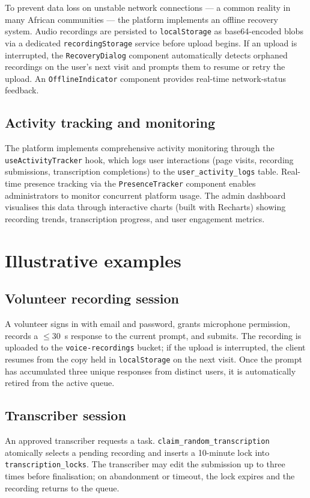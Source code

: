 \documentclass[final,5p,times,twocolumn]{elsarticle}
\begin{document}
To prevent data loss on unstable network connections --- a common reality in many African communities --- the platform implements an offline recovery system. Audio recordings are persisted to \texttt{localStorage} as base64-encoded blobs via a dedicated \texttt{recordingStorage} service before upload begins. If an upload is interrupted, the \texttt{RecoveryDialog} component automatically detects orphaned recordings on the user's next visit and prompts them to resume or retry the upload. An \texttt{OfflineIndicator} component provides real-time network-status feedback.

\subsection{Activity tracking and monitoring}
The platform implements comprehensive activity monitoring through the \texttt{useActivityTracker} hook, which logs user interactions (page visits, recording submissions, transcription completions) to the \texttt{user\_activity\_logs} table. Real-time presence tracking via the \texttt{PresenceTracker} component enables administrators to monitor concurrent platform usage. The admin dashboard visualises this data through interactive charts (built with Recharts) showing recording trends, transcription progress, and user engagement metrics.

\section{Illustrative examples}


\subsection{Volunteer recording session}
A volunteer signs in with email and password, grants microphone permission, records a $\leq 30$~s response to the current prompt, and submits. The recording is uploaded to the \texttt{voice-recordings} bucket; if the upload is interrupted, the client resumes from the copy held in \texttt{localStorage} on the next visit. Once the prompt has accumulated three unique responses from distinct users, it is automatically retired from the active queue.

\subsection{Transcriber session}
An approved transcriber requests a task. \texttt{claim\_random\_transcription} atomically selects a pending recording and inserts a 10-minute lock into \texttt{transcription\_locks}. The transcriber may edit the submission up to three times before finalisation; on abandonment or timeout, the lock expires and the recording returns to the queue.
\end{document}
